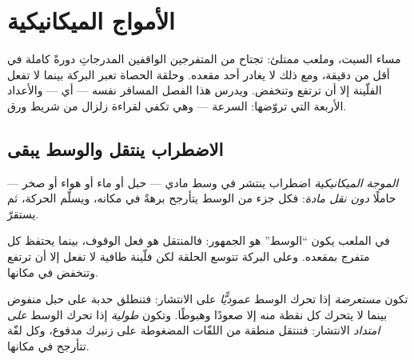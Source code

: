 \chapter{الأمواج الميكانيكية}\label{ch:g12:mechanical-waves}

مساء السبت، وملعب ممتلئ: تجتاح  من المتفرجين الواقفين
المدرجاتِ دورةً كاملة في أقل من دقيقة، ومع ذلك لا يغادر أحد
مقعده. وحلقة الحصاة تعبر البركة بينما لا تفعل الفلّينة إلا أن ترتفع وتنخفض. ويدرس
هذا الفصل المسافر نفسه --- أي  --- والأعداد
الأربعة التي تروّضها: السرعة    --- وهي تكفي
لقراءة زلزال من شريط ورق.

\section{الاضطراب ينتقل والوسط يبقى}

\begin{definition}\label{def:g12:mechanical-waves:wave}
\emph{الموجة الميكانيكية} اضطراب
ينتشر في وسط مادي --- حبل أو ماء أو هواء أو صخر ---
حاملًا  \emph{دون نقل مادة}: فكل جزء من
الوسط يتأرجح برهةً في مكانه، ويسلّم الحركة، ثم يستقرّ.
\end{definition}

\begin{example}\label{ex:g12:mechanical-waves:transport}
في  الملعب يكون ``الوسط'' هو الجمهور: فالمنتقل هو
فعل الوقوف، بينما يحتفظ كل متفرج بمقعده. وعلى
البركة تتوسع الحلقة لكن فلّينة طافية لا تفعل إلا أن ترتفع وتنخفض في مكانها.
\end{example}

\begin{definition}\label{def:g12:mechanical-waves:transverse}
تكون  \emph{مستعرضة} إذا تحرك الوسط
\emph{عموديًّا} على الانتشار: فتنطلق حدبة على حبل
منفوض بينما لا يتحرك كل نقطة منه إلا صعودًا وهبوطًا. وتكون
\emph{طولية} إذا تحرك الوسط
\emph{على امتداد} الانتشار: فتنتقل منطقة من اللفّات المضغوطة على
زنبرك مدفوع، وكل لفّة تتأرجح في مكانها.
\end{definition}

